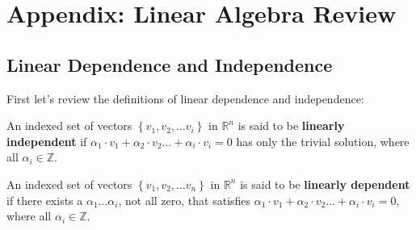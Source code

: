 \chapter{Appendix: Linear Algebra Review}
\label{app:linalg}
\section{Linear Dependence and Independence}
First let's review the definitions of linear dependence and independence\cite{lay}:
    \begin{definition}
    An indexed set of vectors $\left\{v_1, v_2, \dots v_i\right\}$ in ${\mathbb{R}}^n$ is said to be \textbf{linearly independent} if $\alpha_1 \cdot v_1 + \alpha_2 \cdot v_2 \dots + \alpha_i \cdot v_i = 0$ has only the trivial solution, where all $\alpha_i \in \mathbb{Z}$.
    \end{definition}
    \begin{definition}
    An indexed set of vectors $\left\{v_1, v_2, \dots v_n\right\}$ in ${\mathbb{R}}^n$ is said to be \textbf{linearly dependent} if there exists a $\alpha_1 \dots \alpha_i$, not all zero, that satisfies $\alpha_1 \cdot v_1 + \alpha_2 \cdot v_2 \dots + \alpha_i \cdot v_i = 0$, where all $\alpha_i \in \mathbb{Z}$.
    \end{definition}
